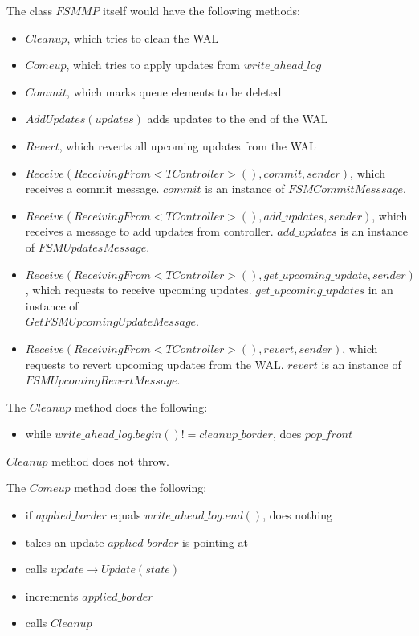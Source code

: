 \documentclass{article}
\begin{document}
The class $FSMMP$ itself would have the following methods:
\begin{itemize}
	\item $Cleanup$, which tries to clean the WAL
	\item $Comeup$, which tries to apply updates from $write\_ahead\_log$
	\item $Commit$, which marks queue elements to be deleted
	\item $AddUpdates(updates)$ adds updates to the end of the WAL
	\item $Revert$, which reverts all upcoming updates from the WAL
	\item $Receive(ReceivingFrom<TController>(), commit, sender)$, which receives a commit message. $commit$ is an instance of $FSMCommitMesssage$.
	\item $Receive(ReceivingFrom<TController>(), add\_updates, sender)$, which receives a message to add updates from controller. $add\_updates$ is an instance of $FSMUpdatesMessage$.
	\item $Receive(ReceivingFrom<TController>(), get\_upcoming\_update, sender)$, which requests to receive upcoming updates. $get\_upcoming\_updates$ in an instance of \\
		$GetFSMUpcomingUpdateMessage$.
	\item $Receive(ReceivingFrom<TController>(), revert, sender)$, which requests to revert upcoming updates from the WAL. $revert$ is an instance of $FSMUpcomingRevertMessage$.
\end{itemize}

The $Cleanup$ method does the following:
\begin{itemize}
	\item while $write\_ahead\_log.begin() != cleanup\_border$, does $pop\_front$
\end{itemize}

$Cleanup$ method does not throw.

The $Comeup$ method does the following:
\begin{itemize}
	\item if $applied\_border$ equals $write\_ahead\_log.end()$, does nothing
	\item takes an update $applied\_border$ is pointing at
	\item calls $update \rightarrow Update(state)$
	\item increments $applied\_border$
	\item calls $Cleanup$
\end{itemize}
\end{document}
